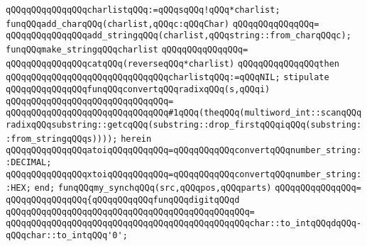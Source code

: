 \verb|qQQqqQQqqQQqqQQqcharlistqQQq:=qQQqsqQQq!qQQq*charlist;|\newline
\newline
\newline
\verb|funqQQqadd_charqQQq(charlist,qQQqc:qQQqChar)|\newline
\verb|qQQqqQQqqQQqqQQq=|\newline
\verb|qQQqqQQqqQQqqQQqadd_stringqQQq(charlist,qQQqstring::from_charqQQqc);|\newline
\newline
\newline
\verb|funqQQqmake_stringqQQqcharlist|\newline
\verb|qQQqqQQqqQQqqQQq=|\newline
\verb|qQQqqQQqqQQqqQQqcatqQQq(reverseqQQq*charlist)|\newline
\verb|qQQqqQQqqQQqqQQqthen|\newline
\verb|qQQqqQQqqQQqqQQqqQQqqQQqqQQqqQQqcharlistqQQq:=qQQqNIL;|\newline
\newline
\newline
\verb|stipulate|\newline
\verb|qQQqqQQqqQQqqQQqfunqQQqconvertqQQqradixqQQq(s,qQQqi)|\newline
\verb|qQQqqQQqqQQqqQQqqQQqqQQqqQQqqQQq=|\newline
\verb|qQQqqQQqqQQqqQQqqQQqqQQqqQQqqQQq#1qQQq(theqQQq(multiword_int::scanqQQqradixqQQqsubstring::getcqQQq(substring::drop_firstqQQqiqQQq(substring::from_stringqQQqs))));|\newline
\verb|herein|\newline
\verb|qQQqqQQqqQQqqQQqatoiqQQqqQQqqQQq=qQQqqQQqqQQqconvertqQQqnumber_string::DECIMAL;|\newline
\verb|qQQqqQQqqQQqqQQqxtoiqQQqqQQqqQQq=qQQqqQQqqQQqconvertqQQqnumber_string::HEX;|\newline
\verb|end;|\newline
\newline
\verb|funqQQqmy_synchqQQq(src,qQQqpos,qQQqparts)|\newline
\verb|qQQqqQQqqQQqqQQq=|\newline
\verb|qQQqqQQqqQQqqQQq{qQQqqQQqqQQqfunqQQqdigitqQQqd|\newline
\verb|qQQqqQQqqQQqqQQqqQQqqQQqqQQqqQQqqQQqqQQqqQQqqQQq=|\newline
\verb|qQQqqQQqqQQqqQQqqQQqqQQqqQQqqQQqqQQqqQQqqQQqqQQqchar::to_intqQQqdqQQq-qQQqchar::to_intqQQq'0';|\newline
\newline
